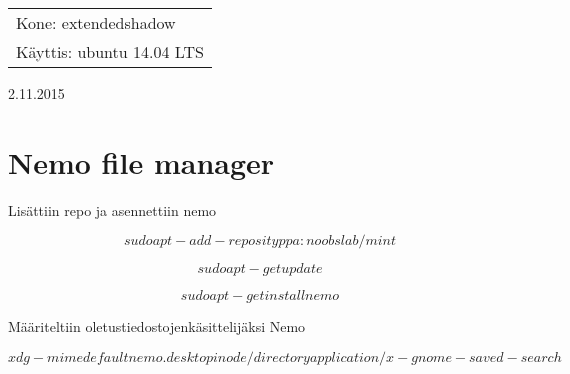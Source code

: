 \documentclass[main.tex]{subfiles}
\begin{document}
\thispagestyle{empty}
\begin{tabular}[t]{l}
Kone: extendedshadow\\
Käyttis: ubuntu 14.04 LTS
\end{tabular}
\hfill 2.11.2015

{\section{Nemo file manager}}

Lisättiin repo ja asennettiin nemo

\[
sudo apt-add-reposity ppa:noobslab/mint
\]

\[
sudo apt-get update
\]

\[
sudo apt-get install nemo
\]

Määriteltiin oletustiedostojenkäsittelijäksi Nemo

\[
xdg-mime default nemo.desktop inode/directory application/x-gnome-saved-search
\]
\end{document}
